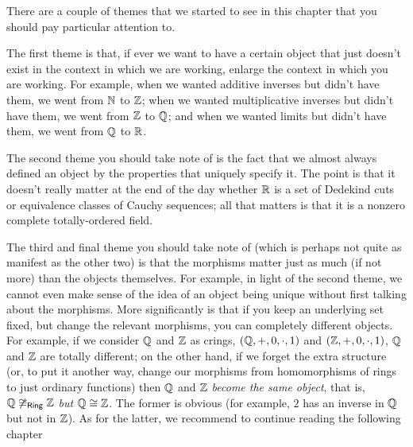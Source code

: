 There are a couple of themes that we started to see in this chapter that you should pay particular attention to.

The first theme is that, if ever we want to have a certain object that just doesn't exist in the context in which we are working, enlarge the context in which you are working.  For example, when we wanted additive inverses but didn't have them, we went from $\mathbb{N}$ to $\mathbb{Z}$; when we wanted multiplicative inverses but didn't have them, we went from $\mathbb{Z}$ to $\mathbb{Q}$; and when we wanted limits but didn't have them, we went from $\mathbb{Q}$ to $\mathbb{R}$.

The second theme you should take note of is the fact that we almost always defined an object by the properties that uniquely specify it.  The point is that it doesn't really matter at the end of the day whether $\mathbb{R}$ is a set of Dedekind cuts or equivalence classes of Cauchy sequences; all that matters is that it is a nonzero complete totally-ordered field.

The third and final theme you should take note of (which is perhaps not quite as manifest as the other two) is that the morphisms matter just as much (if not more) than the objects themselves.  For example, in light of the second theme, we cannot even make sense of the idea of an object being unique without first talking about the morphisms.  More significantly is that if you keep an underlying set fixed, but change the relevant morphisms, you can completely different objects.  For example, if we consider $\mathbb{Q}$ and $\mathbb{Z}$ as crings, $(\mathbb{Q} ,+,0,\cdot ,1)$ and $(\mathbb{Z} ,+,0,\cdot ,1)$, $\mathbb{Q}$ and $\mathbb{Z}$ are totally different; on the other hand, if we forget the extra structure (or, to put it another way, change our morphisms from homomorphisms of rings to just ordinary functions) then $\mathbb{Q}$ and $\mathbb{Z}$ \emph{become the same object}, that is, $\mathbb{Q} \not \cong _{\mathsf{Ring}}\mathbb{Z}$ \emph{but} $\mathbb{Q} \cong \mathbb{Z}$.  The former is obvious (for example, $2$ has an inverse in $\mathbb{Q}$ but not in $\mathbb{Z}$).  As for the latter, we recommend to continue reading the following chapter\textellipsis